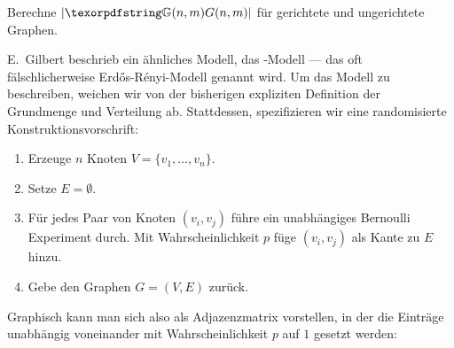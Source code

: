 \begin{exercise}
    Berechne $|\gGnm|$ für gerichtete und ungerichtete Graphen.
\end{exercise}

E.~Gilbert  beschrieb ein ähnliches Modell, das \Gnp-Modell --- das oft fälschlicherweise \glqq Erd\H{o}s-R\'enyi-Modell \grqq{} genannt wird.
Um das Modell zu beschreiben, weichen wir von der bisherigen expliziten Definition der Grundmenge und Verteilung ab.
Stattdessen, spezifizieren wir eine randomisierte Konstruktionsvorschrift:
\begin{enumerate}
    \item Erzeuge $n$ Knoten $V = \{v_1, \ldots, v_n\}$.
    \item Setze $E = \emptyset$.
    \item Für jedes Paar von Knoten $(v_i, v_j)$ führe ein unabhängiges Bernoulli Experiment durch.
          Mit Wahrscheinlichkeit $p$ füge $(v_i, v_j)$ als Kante zu $E$ hinzu.
    \item Gebe den Graphen $G=(V, E)$ zurück.
\end{enumerate}

\noindent
Graphisch kann man sich also \Gnp als Adjazenzmatrix vorstellen, in der die Einträge unabhängig voneinander mit Wahrscheinlichkeit $p$ auf $1$ gesetzt werden:

\begin{center}

\end{center}

